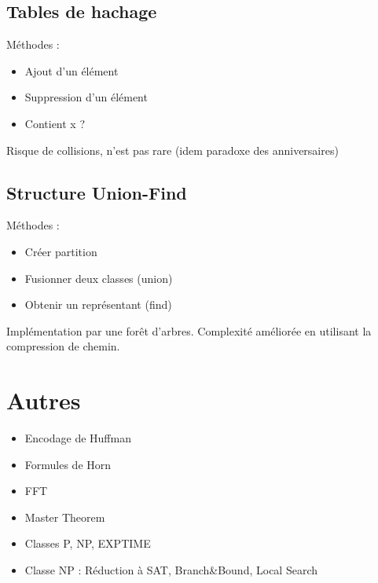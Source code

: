 \documentclass[10pt,a4paper]{article}
\begin{document}
\subsection{Tables de hachage}
	
Méthodes : 
\begin{itemize}[noitemsep]
	\item Ajout d'un élément
	\item Suppression d'un élément
	\item Contient x ?
\end{itemize}

Risque de collisions, n'est pas rare (idem paradoxe des anniversaires)

\subsection{Structure Union-Find}

Méthodes : 
\begin{itemize}[noitemsep]
	\item Créer partition
	\item Fusionner deux classes (union)
	\item Obtenir un représentant (find)
\end{itemize}

Implémentation par une forêt d'arbres. %
Complexité améliorée en utilisant la compression de chemin.




\section{Autres}

\begin{itemize}[noitemsep]
	\item Encodage de Huffman
	\item Formules de Horn
	\item FFT
	\item Master Theorem
	\item Classes P, NP, EXPTIME
	\item Classe NP : Réduction à SAT, Branch\&Bound, Local Search
\end{itemize}
\end{document}
